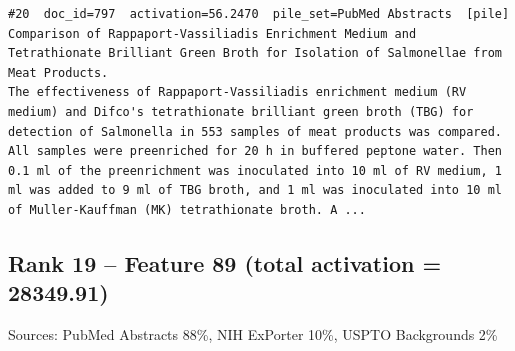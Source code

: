 \begin{verbatim}
#20  doc_id=797  activation=56.2470  pile_set=PubMed Abstracts  [pile]
Comparison of Rappaport-Vassiliadis Enrichment Medium and Tetrathionate Brilliant Green Broth for Isolation of Salmonellae from Meat Products.
The effectiveness of Rappaport-Vassiliadis enrichment medium (RV medium) and Difco's tetrathionate brilliant green broth (TBG) for detection of Salmonella in 553 samples of meat products was compared. All samples were preenriched for 20 h in buffered peptone water. Then 0.1 ml of the preenrichment was inoculated into 10 ml of RV medium, 1 ml was added to 9 ml of TBG broth, and 1 ml was inoculated into 10 ml of Muller-Kauffman (MK) tetrathionate broth. A ...

\end{verbatim}

\subsection*{Rank 19 -- Feature 89 (total activation = 28349.91)}

Sources: PubMed Abstracts 88\%, NIH ExPorter 10\%, USPTO Backgrounds 2\%

